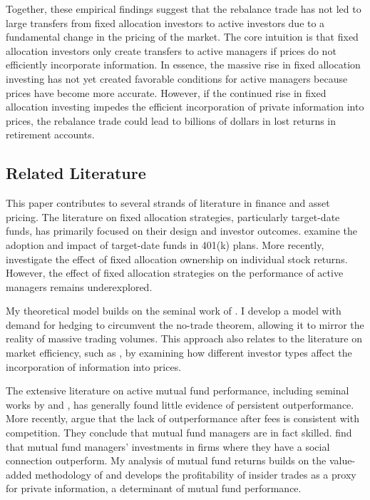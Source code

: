 \documentclass[12pt]{article}
\begin{document}
\par Together, these empirical findings suggest that the rebalance trade has not led to large transfers from fixed allocation investors to active investors due to a fundamental change in the pricing of the market. The core intuition is that fixed allocation investors only create transfers to active managers if prices do not efficiently incorporate information. In essence, the massive rise in fixed allocation investing has not yet created favorable conditions for active managers because prices have become more accurate. However, if the continued rise in fixed allocation investing impedes the efficient incorporation of private information into prices, the rebalance trade could lead to billions of dollars in lost returns in retirement accounts.

\subsection{Related Literature}

\par This paper contributes to several strands of literature in finance and asset pricing. The literature on fixed allocation strategies, particularly target-date funds, has primarily focused on their design and investor outcomes. \citet{MitchellUtkus2020} examine the adoption and impact of target-date funds in 401(k) plans. More recently, \citet{ParkerSchoarSun} investigate the effect of fixed allocation ownership on individual stock returns. However, the effect of fixed allocation strategies on the performance of active managers remains underexplored.

\par My theoretical model builds on the seminal work of \citet{MILGROM198217}. I develop a model with demand for hedging to circumvent the no-trade theorem, allowing it to mirror the reality of massive trading volumes. This approach also relates to the literature on market efficiency, such as \citet{Grossman1980}, by examining how different investor types affect the incorporation of information into prices.

\par The extensive literature on active mutual fund performance, including seminal works by \citet{Jensen1968} and \citet{Carhart}, has generally found little evidence of persistent outperformance. More recently, \citet{BERK2015} argue that the lack of outperformance after fees is consistent with competition. They conclude that mutual fund managers are in fact skilled. \citet{CFM} find that mutual fund managers' investments in firms where they have a social connection outperform. My analysis of mutual fund returns builds on the value-added methodology of \citet{BERK2015} and develops the profitability of insider trades as a proxy for private information, a determinant of mutual fund performance.
\end{document}
